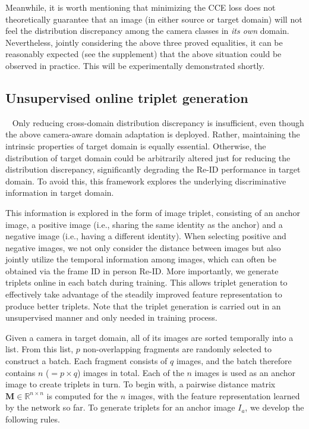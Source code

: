 \documentclass[10pt,twocolumn,letterpaper]{article}
\begin{document}
Meanwhile, it is worth mentioning that minimizing the CCE loss does not theoretically guarantee that an image (in either source or target domain) will not feel the distribution discrepancy among the camera classes in \textit{its own} domain. Nevertheless, jointly considering the above three proved equalities, it can be reasonably expected (see the supplement) that the above situation could be observed in practice. This will be experimentally demonstrated shortly.  
 


 
\subsection{Unsupervised online triplet generation}~\label{sec:UOT}
Only reducing cross-domain distribution discrepancy is insufficient, even though the above camera-aware domain adaptation is deployed. Rather, maintaining the intrinsic properties of target domain is equally essential. Otherwise, the distribution of target domain could be arbitrarily altered just for reducing the distribution discrepancy, significantly degrading the Re-ID performance in target domain. To avoid this, this framework explores the underlying discriminative information in target domain. 

This information is explored in the form of image triplet, consisting of an anchor image, a positive image (i.e., sharing the same identity as the anchor) and a negative image (i.e., having a different identity). When selecting positive and negative images, we not only consider the distance between images but also jointly utilize the temporal information among images, which can often be obtained via the frame ID in person Re-ID.
More importantly, we generate triplets online in each batch during training. This allows triplet generation to effectively take advantage of the steadily improved feature representation to produce better triplets.
Note that the triplet generation is carried out in an unsupervised manner and only needed in training process. 
 
Given a camera in target domain, all of its images are sorted temporally into a list. From this list, $p$ non-overlapping fragments are randomly selected to construct a batch. Each fragment consists of $q$ images, and the batch therefore contains $n$ ($=p\times q$) images in total. Each of the $n$ images is used as an anchor image to create triplets in turn. 
To begin with, a pairwise distance matrix ${\mathbf M}\in \mathbb{R}^{n\times n}$ is computed for the $n$ images, with the feature representation learned by the network so far. To generate triplets for an anchor image $I_{a}$, we develop the following rules.
\end{document}
